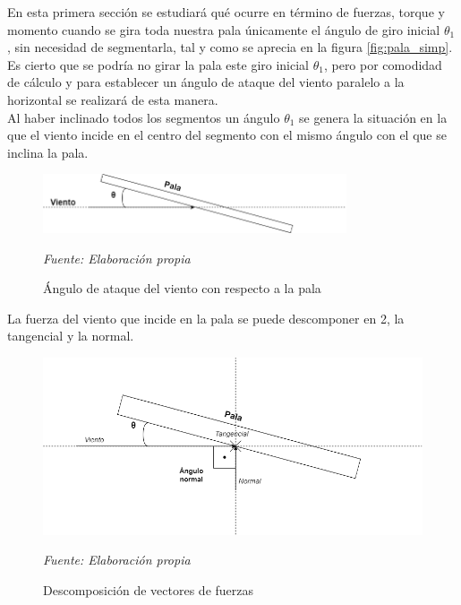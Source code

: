 En esta primera sección se estudiará qué ocurre en término de fuerzas, torque y momento cuando se gira toda nuestra pala únicamente el ángulo de giro inicial $ \theta_1 $, sin necesidad de segmentarla, tal y como se aprecia en la figura \ref{fig:pala_simp}. \\


Es cierto que se podría no girar la pala este giro inicial $ \theta_1 $, pero por comodidad de cálculo y para establecer un ángulo de ataque del viento paralelo a la horizontal se realizará de esta manera.\\


Al haber inclinado todos los segmentos un ángulo $ \theta_1 $ se genera la situación en la que el viento incide en el centro del segmento con el mismo ángulo con el que se inclina la pala. \\

    \textbf{}
    \begin{figure}[H]
    \centering
    \includegraphics[width=0.8\textwidth]{images/dibujo angulo ataque.drawio.png}
    \caption{Ángulo de ataque del viento con respecto a la pala}
    \textit{Fuente: Elaboración propia}
    \label{fig:dibujo_angulo_ataque}
\end{figure}

La fuerza del viento que incide en la pala se puede descomponer en 2, la tangencial y la normal. \\

    \textbf{}
    \begin{figure}[H]
    \centering
    \includegraphics[width=1\textwidth]{images/dibujo fuerzas.drawio.png}
    \caption{Descomposición de vectores de fuerzas}
    \textit{Fuente: Elaboración propia}
    \label{fig:dibujo_fuerzas}
\end{figure}


